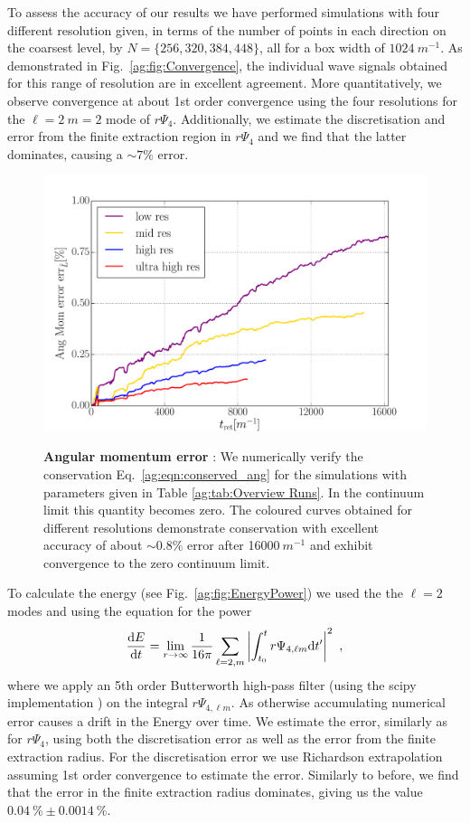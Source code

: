 To assess the accuracy of our results we have performed simulations with four different resolution given, in terms of the number of points in each direction on the coarsest level, by $N = \{256,320,384,448\}$, all for a box width
of $1024~m^{-1}$. As demonstrated in Fig.~\ref{ag:fig:Convergence}, the individual wave signals obtained for this range of resolution are
in excellent agreement.
More quantitatively, we observe convergence at about 1st order convergence
using the four resolutions for the $\ell = 2~m=2$ mode of $r\Psi_4$. Additionally, we estimate the discretisation and error from the finite extraction region in $r\Psi_4$ and we find that the latter dominates, causing a $\sim 7\%$ error.



\begin{figure}[h!]
\begin{center}
{\includegraphics[width=0.7\columnwidth]{ag_fig/ang_error_flux_with_radius_60.pdf}}
    \caption{{\bf Angular momentum error }: We numerically
    verify the conservation Eq.~\ref{ag:eqn:conserved_ang} for the simulations with parameters
    given in Table \ref{ag:tab:Overview Runs}. In the continuum limit this
    quantity becomes zero. The coloured curves
    obtained for different resolutions demonstrate
    conservation with excellent accuracy of
    about $\sim 0.8\%$ error after 16000$~m^{-1}$
    and exhibit convergence to the zero continuum limit.
    }
\label{ag:fig:ViolCons}
\end{center}
\end{figure}




To calculate the energy (see Fig.~\ref{ag:fig:EnergyPower}) we used the the $\ell = 2 $ modes and using the equation for the power
\begin{equation}\label{ag:eq:GWpower}
    \frac{{\rm d}E}{{\rm d}t} = \lim_{r\rightarrow \infty} \frac{1}{16 \pi} \sum_{\ell = 2, m} \left|\int_{t_0}^{t}  r\Psi_{4,\ell m}{\rm d}t^\prime \right|^2~,
\end{equation}
where we apply an 5th order Butterworth high-pass filter (using the scipy implementation \cite{jones_scipy_2001}) on the integral $r\Psi_{4,\ell m}$. As otherwise accumulating numerical error causes a  drift in the Energy over time.
We estimate the error, similarly as for $r\Psi_4$, using both the discretisation error as well as the error from the finite extraction radius. For the discretisation error we use Richardson extrapolation assuming 1st order convergence to estimate the error. Similarly to before, we find that the error in the finite extraction radius dominates, giving us the value $ 0.04~\% \pm 0.0014~\% $.

